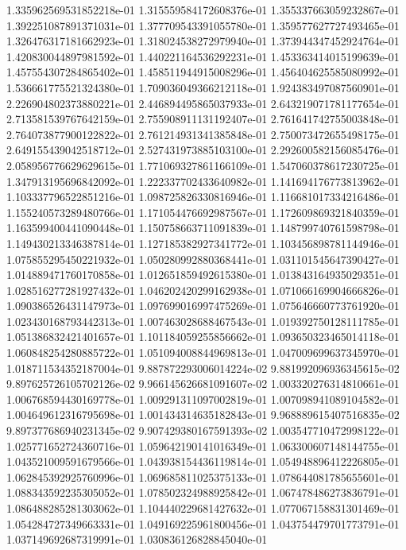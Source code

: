 1.335962569531852218e-01
1.315559584172608376e-01
1.355337663059232867e-01
1.392251087891371031e-01
1.377709543391055780e-01
1.359577627727493465e-01
1.326476317181662923e-01
1.318024538272979940e-01
1.373944347452924764e-01
1.420830044897981592e-01
1.440221164536292231e-01
1.453363414015199639e-01
1.457554307284865402e-01
1.458511944915008296e-01
1.456404625585080992e-01
1.536661775521324380e-01
1.709036049366212118e-01
1.924383497087560901e-01
2.226904802373880221e-01
2.446894495865037933e-01
2.643219071781177654e-01
2.713581539767642159e-01
2.755908911131192407e-01
2.761641742755003848e-01
2.764073877900122822e-01
2.761214931341385848e-01
2.750073472655498175e-01
2.649155439042518712e-01
2.527431973885103100e-01
2.292600582156085476e-01
2.058956776629629615e-01
1.771069327861166109e-01
1.547060378617230725e-01
1.347913195696842092e-01
1.222337702433640982e-01
1.141694176773813962e-01
1.103337796522851216e-01
1.098725826330816946e-01
1.116681017334216486e-01
1.155240573289480766e-01
1.171054476692987567e-01
1.172609869321840359e-01
1.163599400441090448e-01
1.150758663711091839e-01
1.148799740761598798e-01
1.149430213346387814e-01
1.127185382927341772e-01
1.103456898781144946e-01
1.075855295450221932e-01
1.050280992880368441e-01
1.031101545647390427e-01
1.014889471760170858e-01
1.012651859492615380e-01
1.013843164935029351e-01
1.028516277281927432e-01
1.046202420299162938e-01
1.071066169904666826e-01
1.090386526431147973e-01
1.097699016997475269e-01
1.075646660773761920e-01
1.023430168793442313e-01
1.007463028688467543e-01
1.019392750128111785e-01
1.051386832421401657e-01
1.101184059255856662e-01
1.093650323465014118e-01
1.060848254280885722e-01
1.051094008844969813e-01
1.047009699637345970e-01
1.018711534352187004e-01
9.887872293006014224e-02
9.881992096936345615e-02
9.897625726105702126e-02
9.966145626681091607e-02
1.003320276314810661e-01
1.006768594430169778e-01
1.009291311097002819e-01
1.007098941089104582e-01
1.004649612316795698e-01
1.001434314635182843e-01
9.968889615407516835e-02
9.897377686940231345e-02
9.907429380167591393e-02
1.003547710472998122e-01
1.025771652724360716e-01
1.059642190141016349e-01
1.063300607148144755e-01
1.043521009591679566e-01
1.043938154436119814e-01
1.054948896412226805e-01
1.062845392925760996e-01
1.069685811025375133e-01
1.078644081785655601e-01
1.088343592235305052e-01
1.078502324988925842e-01
1.067478486273836791e-01
1.086488285281303062e-01
1.104440229681427632e-01
1.077067158831301469e-01
1.054284727349663331e-01
1.049169225961800456e-01
1.043754479701773791e-01
1.037149692687319991e-01
1.030836126828845040e-01
